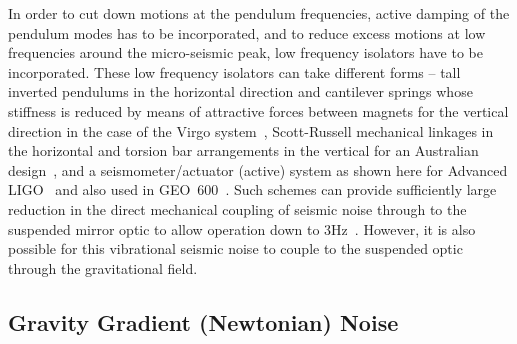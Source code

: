 \documentclass{article}
\begin{document}

In order to cut down motions at the pendulum frequencies, active damping of the
pendulum modes has to be incorporated, and to reduce excess motions at low
frequencies around the micro-seismic peak, low frequency isolators have to be
incorporated. These low frequency isolators can take different forms -- tall
inverted pendulums in the horizontal direction and cantilever springs whose
stiffness is reduced by means of attractive forces between magnets for the
vertical direction in the case of the Virgo system~\cite{Losurdo},
Scott-Russell mechanical linkages in the horizontal and torsion bar arrangements
in the vertical for an Australian design~\cite{Winterflood}, and a
seismometer/actuator (active) system as shown here for Advanced
LIGO~\cite{Abbott:2002} and also used in GEO~600~\cite{Plissi2}.  Such schemes
can provide sufficiently large reduction in the direct mechanical coupling of
seismic noise through to the suspended mirror optic to allow operation down to
3Hz~\cite{Braccini:1993,ETweb}. However, it is also possible for this
vibrational seismic noise to couple to the suspended optic through the
gravitational field.


\subsection{Gravity Gradient (Newtonian) Noise}
\label{subsection:gravitygradient}
\end{document}
